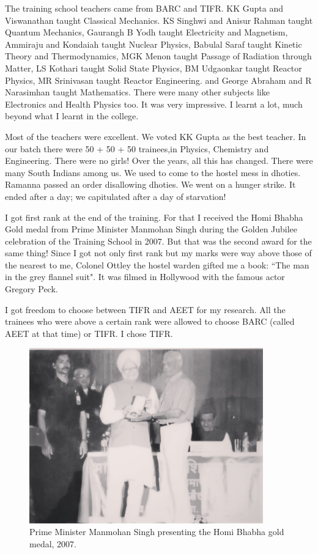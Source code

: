 The training school teachers came from BARC and TIFR. KK Gupta and 
Viswanathan taught Classical Mechanics. KS Singhwi and Anisur Rahman 
taught Quantum Mechanics, Gaurangh B Yodh taught Electricity and 
Magnetism, Ammiraju and Kondaiah taught Nuclear Physics, Babulal Saraf 
taught Kinetic Theory and Thermodynamics, MGK Menon taught Passage of 
Radiation through Matter, LS Kothari taught Solid State Physics, BM 
Udgaonkar taught Reactor Physics, MR Srinivasan taught Reactor 
Engineering. and George Abraham and R Narasimhan taught Mathematics. 
There were many other subjects like Electronics and Health Physics too. 
It was very impressive. I learnt a lot, much beyond what I learnt in the 
college.

Most of the teachers were excellent. We voted KK Gupta as the best teacher.
In our batch there were 50 + 50 + 50 trainees,in Physics, Chemistry
and Engineering. There were no girls! Over the years, all this has changed.
There were many South Indians among us. We used to come to the hostel 
mess in dhoties. Ramanna passed an order disallowing dhoties. We went on 
a hunger strike. It ended after a day; we capitulated after a day of 
starvation!

I got first rank at the end of the training. For that I received the 
Homi Bhabha Gold medal from Prime Minister Manmohan Singh during the 
Golden Jubilee celebration of the Training School in 2007. But that was 
the second award for the same thing! Since I got not only first rank but 
my marks were way above those of the nearest to me, Colonel Ottley the 
hostel warden gifted me a book: ``The man in the grey flannel suit". It 
was filmed in Hollywood with the famous actor Gregory Peck.
 
I got freedom to choose between TIFR and AEET for my research. All the 
trainees who were above a certain rank were allowed to choose BARC 
(called AEET at that time) or TIFR. I chose TIFR.
\begin{figure}[h]
\centering
\includegraphics[width=0.9\textwidth]{images/Rajaji-04.jpg}
\caption{Prime Minister Manmohan Singh presenting the Homi Bhabha
gold medal, 2007.}
\end{figure}

